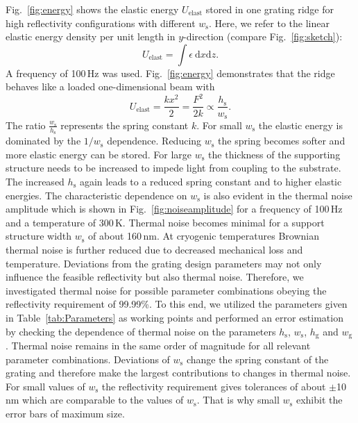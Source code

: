 \documentclass[twocolumn,secnumarabic,amssymb, nobibnotes, aps, prd, showpacs]{revtex4-1}
\begin{document}
Fig.~\ref{fig:energy} shows the elastic energy $\textit{U}_\mathrm{elast}$ stored in one grating ridge for high reflectivity configurations with different $w_\mathrm{s}$. Here, we refer to the linear elastic energy density per unit length in $y$-direction (compare Fig.~\ref{fig:sketch}): 
\begin{equation}
\textit{U}_\mathrm{elast}=\int\epsilon\ \mathrm{d}x\mathrm{d}z.
\end{equation} 
A frequency of 100\,Hz was used. Fig.~\ref{fig:energy} demonstrates that the ridge behaves like a loaded one-dimensional beam with
\begin{equation}
\textit{U}_\mathrm{elast}=\frac{kx^2}{2}=\frac{F^2}{2k}\propto\frac{h_\mathrm{s}}{w_\mathrm{s}}.
\end{equation}
The ratio $\frac{w_\mathrm{s}}{h_\mathrm{s}}$ represents the spring constant $k$. For small $w_\mathrm{s}$ the elastic energy is dominated by the $1/w_\mathrm{s}$ dependence. Reducing $w_\mathrm{s}$ the spring becomes softer and more elastic energy can be stored. For large $w_\mathrm{s}$ the thickness of the supporting structure needs to be increased to impede light from coupling to the substrate. The increased $h_\mathrm{s}$ again leads to a reduced spring constant and to higher elastic energies. The characteristic dependence on $w_\mathrm{s}$ is also evident in the thermal noise amplitude which is shown in Fig.~\ref{fig:noiseamplitude} for a frequency of 100\,Hz and a temperature of 300\,K. Thermal noise becomes minimal for a support structure width $w_\mathrm{s}$ of about 160\,nm. At cryogenic temperatures Brownian thermal noise is further reduced due to decreased mechanical loss and temperature.\newline
Deviations from the grating design parameters may not only influence the feasible reflectivity but also thermal noise. Therefore, we investigated thermal noise for possible parameter combinations obeying the reflectivity requirement of 99.99\%. To this end, we utilized the parameters given in Table~\ref{tab:Parameters} as working points and performed an error estimation by checking the dependence of thermal noise on the parameters $h_\mathrm{s}$, $w_\mathrm{s}$, $h_\mathrm{g}$ and $w_\mathrm{g}$. Thermal noise remains in the same order of magnitude for all relevant parameter combinations. Deviations of $w_\mathrm{s}$ change the spring constant of the grating and therefore make the largest contributions to changes in thermal noise. For small values of $w_\mathrm{s}$ the reflectivity requirement gives tolerances of about $\pm$10\,nm which are comparable to the values of $w_\mathrm{s}$. That is why small $w_\mathrm{s}$ exhibit the error bars of maximum size. 
\end{document}

